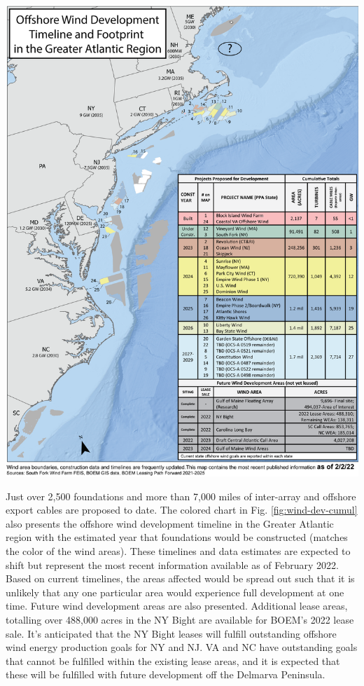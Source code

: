 \documentclass[
  10pt,
]{article}
\let\origfigure\figure
\let\endorigfigure\endfigure
\renewenvironment{figure}[1][2] {
    \expandafter\origfigure\expandafter[H]
} {
    \endorigfigure
}
\begin{document}
\begin{figure}

{\centering \includegraphics[width=0.9\linewidth]{images/offshore_wind_timeline} 

}

\caption{All Northeast Project areas by year construction ends (each project has 2 year construction period).}\label{fig:wind-dev-cumul}
\end{figure}

Just over 2,500 foundations and more than 7,000 miles of inter-array and
offshore export cables are proposed to date. The colored chart in Fig.
\ref{fig:wind-dev-cumul} also presents the offshore wind development
timeline in the Greater Atlantic region with the estimated year that
foundations would be constructed (matches the color of the wind areas).
These timelines and data estimates are expected to shift but represent
the most recent information available as of February 2022. Based on
current timelines, the areas affected would be spread out such that it
is unlikely that any one particular area would experience full
development at one time. Future wind development areas are also
presented. Additional lease areas, totalling over 488,000 acres in the
NY Bight are available for BOEM's 2022 lease sale. It's anticipated that
the NY Bight leases will fulfill outstanding offshore wind energy
production goals for NY and NJ. VA and NC have outstanding goals that
cannot be fulfilled within the existing lease areas, and it is expected
that these will be fulfilled with future development off the Delmarva
Peninsula.
\end{document}
